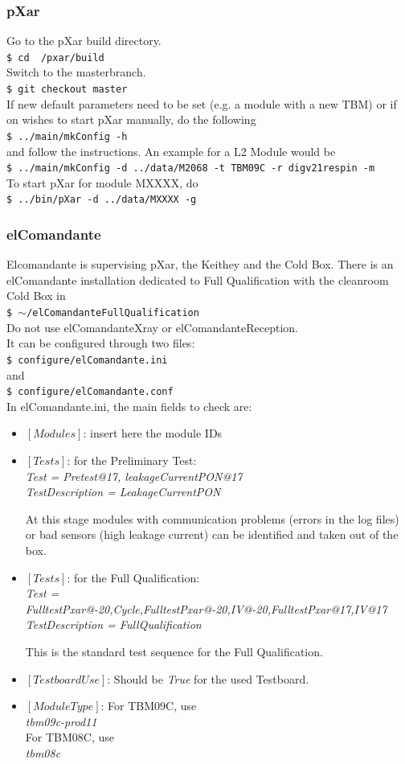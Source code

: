 \documentclass[fleqn,10pt]{SelfArx} %
\newcommand{\shellcmd}[1]{\\\indent\indent\texttt{\footnotesize\$ #1}\\}
\begin{document}
\subsubsection{pXar}
Go to the pXar build directory. 
\shellcmd{cd ~/pxar/build}
Switch to the masterbranch.
\shellcmd{git checkout master}
If new default parameters need to be set (e.g. a module with a new TBM) or if on wishes to start pXar manually, do the following
\shellcmd{../main/mkConfig -h }
and follow the instructions. An example for a L2 Module would be 
\shellcmd{../main/mkConfig -d ../data/M2068 -t TBM09C -r digv21respin -m}
To start pXar for module MXXXX, do
\shellcmd{../bin/pXar -d ../data/MXXXX -g}

\subsubsection{elComandante}\label{elcom}
Elcomandante is supervising pXar, the Keithey and the Cold Box. There is an elComandante installation dedicated to Full Qualification with the cleanroom Cold Box in 
\shellcmd{ $\sim$/elComandanteFullQualification} 
Do not use elComandanteXray or elComandanteReception. \\
It can be configured through two files:
\shellcmd{configure/elComandante.ini}
and
\shellcmd{configure/elComandante.conf}
In elComandante.ini, the main fields to check are:
\begin{itemize}
\item $[Modules]$: insert here the module IDs
\item $[Tests]$: for the Preliminary Test:\\
{\it Test = Pretest@17, leakageCurrentPON@17}\\
{\it TestDescription = LeakageCurrentPON}

At this stage modules with communication problems (errors in the log files) or bad sensors (high leakage current) can be identified and taken out of the box.
\item $[Tests]$: for the Full Qualification:\\
{\it Test = FulltestPxar@-20,Cycle,FulltestPxar@-20,IV@-20,FulltestPxar@17,IV@17}\\
{\it TestDescription = FullQualification}

This is the standard test sequence for the Full Qualification.
\item $[TestboardUse]$: Should be {\it True} for the used Testboard.
\item $[ModuleType]$: 
For TBM09C, use \\
{\it tbm09c-prod11}\\
For TBM08C, use \\
{\it tbm08c}
\end{itemize}
\end{document}

